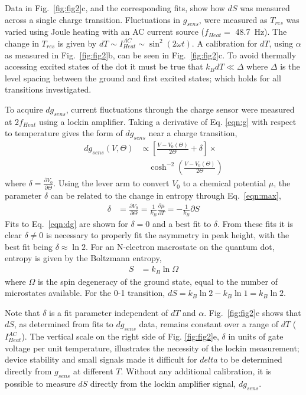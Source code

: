 \documentclass[preprint,showpacs,preprintnumbers,amsmath,amssymb,pra,aps,superscriptaddress]{revtex4-1}
\begin{document}
Data in Fig.~\ref{fig:fig2}c, and the corresponding fits, show how $dS$ was measured across a single charge transition. Fluctuations in $g_{sens}$, were measured as $T_{res}$ was varied using Joule heating with an AC current source ($f_{Heat} =$ \SI{48.7}{\hertz}). The change in $T_{res}$ is given by $dT \sim I^{AC}_{Heat} \sim \sin^2(2\omega t)$. A calibration for $dT$, using $\alpha$ as measured in Fig.~\ref{fig:fig2}b, can be seen in Fig.~\ref{fig:fig2}c. To avoid thermally accessing excited states of the dot it must be true that $k_B dT \ll \Delta$ where $\Delta$ is the level spacing between the ground and first excited states; which holds for all transitions investigated. 

To acquire $dg_{sens}$, current fluctuations through the charge sensor were measured at $2f_{Heat}$ using a lockin amplifier. Taking a derivative of Eq. \ref{eqn:g} with respect to temperature gives the form of $dg_{sens}$ near a charge transition,
%
\begin{align}
\label{eqn:dg}
        dg_{sens}(V, \Theta) &\propto \left[ \frac{V-V_0(\Theta)}{2\Theta} + \delta \right]\times \\
        				      &\quad\cosh^{-2}\left(\frac{V-V_0(\Theta)}{2\Theta}\right) \nonumber
\end{align}
%
where $\delta=\frac{\partial V_0}{\partial \Theta}$. Using the lever arm to convert $V_0$ to a chemical potential $\mu$, the parameter $\delta$ can be related to the change in entropy through Eq.~\ref{eqn:max},
%
\begin{align}
\label{eqn:delta}
        \delta &= \frac{\partial V_0}{\partial \Theta} = 
        \frac{1}{k_B} \frac{\partial \mu}{\partial T} = 
        -\frac{1}{k_B} \partial S
\end{align}
%
Fits to Eq.~\ref{eqn:dg} are shown for $\delta=0$ and a best fit to $\delta$. From these fits it is clear $\delta\neq0$ is necessary to properly fit the asymmetry in peak height, with the best fit being $\delta \approx \ln{2}$. For an N-electron macrostate on the quantum dot, entropy is given by the Boltzmann entropy,
%
\begin{align}
\label{eqn:S}
        S &= k_B \ln{\Omega}
\end{align}
%
where $\Omega$ is the spin degeneracy of the ground state, equal to the number of microstates available. For the 0-1 transition, $dS =  k_B\ln{2} - k_B \ln{1} = k_B\ln{2}$.

Note that $\delta$ is a fit parameter independent of $dT$ and $\alpha$. Fig.~\ref{fig:fig2}e shows that $dS$, as determined from fits to $dg_{sens}$ data, remains constant over a range of $dT$ ($I^{AC}_{Heat}$). The vertical scale on the right side of Fig. \ref{fig:fig2}e, $\delta$ in units of gate voltage per unit temperature, illustrates the necessity of the lockin measurement; device stability and small signals made it difficult for $delta$ to be determined directly from $g_{sens}$ at different $T$. Without any additional calibration, it is possible to measure $dS$ directly from the lockin amplifier signal, $dg_{sens}$.
\end{document}
